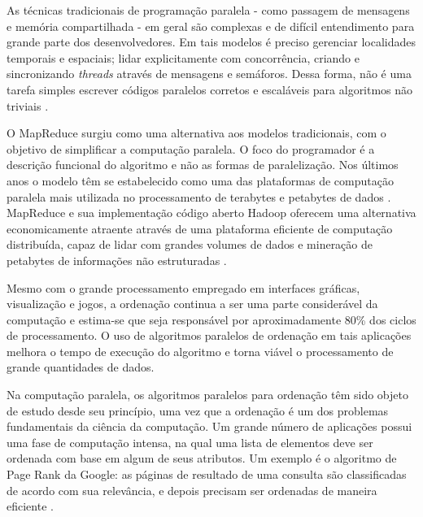 
As técnicas tradicionais de programação paralela - como passagem de mensagens e memória compartilhada - em geral são complexas e de difícil entendimento para grande parte dos desenvolvedores. Em tais modelos é preciso gerenciar localidades temporais e espaciais; lidar explicitamente com concorrência, criando e sincronizando \textit{threads} através de mensagens e semáforos. Dessa forma, não é uma tarefa simples escrever códigos paralelos corretos e escaláveis para algoritmos não triviais \cite{Breshears:2009}.


O MapReduce surgiu como uma alternativa aos modelos tradicionais, com o objetivo de simplificar a computação paralela. 
O foco do programador é a descrição funcional do algoritmo e não as formas de paralelização. Nos últimos anos o modelo têm se estabelecido como uma das plataformas de computação paralela mais utilizada no processamento de terabytes e petabytes de dados \cite{Ranger:2007}.
MapReduce e sua implementação código aberto Hadoop oferecem  uma alternativa economicamente atraente através de uma plataforma eficiente de computação distribuída, capaz de lidar com grandes volumes de dados e mineração de petabytes de informações não estruturadas \cite{Cherkasova:2011}.

Mesmo com o grande processamento  empregado em interfaces gráficas, visualização e jogos, a ordenação continua a ser uma parte considerável da computação e estima-se que seja responsável por aproximadamente 80\% dos ciclos de processamento\cite{Ranger:2007}. O uso de algoritmos paralelos de ordenação em tais aplicações melhora o tempo de execução do algoritmo e torna viável o processamento de grande quantidades de dados.


Na computação paralela, os algoritmos paralelos para ordenação têm sido objeto de estudo desde seu princípio, uma vez que a  ordenação é um dos problemas fundamentais da ciência da computação.
Um grande número de aplicações possui uma fase de computação intensa, na qual uma lista de elementos deve ser ordenada com base em algum de seus atributos. Um exemplo é o algoritmo de Page Rank \cite{Page:1999} da Google: as páginas de resultado de uma consulta são classificadas de acordo com sua relevância, e depois precisam ser ordenadas de maneira eficiente \cite{Kale:2010}. 
 

